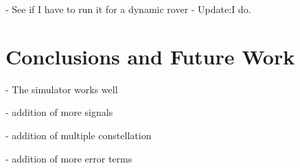 \documentclass[12pt]{report}
\begin{document}
        - See if I have to run it for a dynamic rover 
            - Update:I do.




\chapter{Conclusions and Future Work}
- The simulator works well 

- addition of more signals

- addition of multiple constellation

- addition of more error terms













\end{document}
